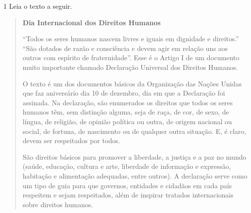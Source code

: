 \begin{escolha}
\begin{escolha}
{\begin{escolha}


\num{1} Leia o texto a seguir.


\begin{quote}
\textbf{Dia Internacional dos Direitos Humanos}


``Todos os seres humanos nascem livres e iguais em dignidade e
direitos.'' ``São dotados de razão e consciência e devem agir em relação
uns aos outros com espírito de fraternidade''. Esse é o Artigo I de um
documento muito importante chamado Declaração Universal dos Direitos
Humanos.

O texto é um dos documentos básicos da Organização das Nações Unidas que
faz aniversário dia 10 de dezembro, dia em que a Declaração foi
assinada. Na declaração, são enumerados os direitos que todos os seres
humanos têm, sem distinção alguma, seja de raça, de cor, de sexo, de
língua, de religião, de opinião política ou outra, de origem nacional ou
social, de fortuna, de nascimento ou de qualquer outra situação. E, é
claro, devem ser respeitados por todos.

São direitos básicos para promover a liberdade, a justiça e a paz no
mundo (saúde, educação, cultura e arte, liberdade de informação e
expressão, habitação e alimentação adequadas, entre outros). A
declaração serve como um tipo de guia para que governos, entidades e
cidadãos em cada país respeitem e sejam respeitados, além de inspirar
tratados internacionais sobre direitos humanos.


\end{quote}
\end{escolha}}
\end{escolha}
\end{escolha}
